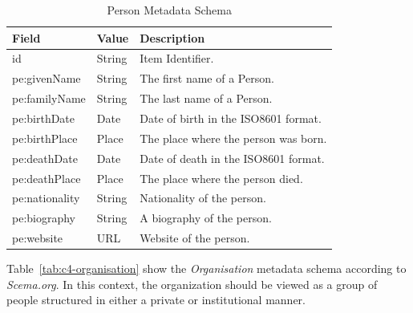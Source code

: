 \begin{longtable}{|p{}|p{}|p{}|}
    \caption{Person Metadata Schema} \label{tab:c4-person} \\
    \hline
    \textbf{Field} & \textbf{Value} & \textbf{Description} \\
    \hline

    \scriptsize id                      & \scriptsize String                                            &  \scriptsize Item Identifier. \\
    \hline
    \scriptsize pe:givenName               & \scriptsize String                                             &  \scriptsize The first name of a Person.\\
    \hline
    \scriptsize pe:familyName              & \scriptsize String                                             &  \scriptsize The last name of a Person.\\
    \hline
    \scriptsize pe:birthDate               & \scriptsize Date                                             &  \scriptsize Date of birth in the ISO8601 format.\\
    \hline
    \scriptsize pe:birthPlace              & \scriptsize \textcolor{uniudColor3}{Place}                    &  \scriptsize The place where the person was born.\\
    \hline
    \scriptsize pe:deathDate               & \scriptsize Date                                             &  \scriptsize Date of death in the ISO8601 format.\\
    \hline
    \scriptsize pe:deathPlace              & \scriptsize \textcolor{uniudColor3}{Place}                    &  \scriptsize The place where the person died.\\
    \hline
    \scriptsize pe:nationality             & \scriptsize String                                       &  \scriptsize Nationality of the person.\\
    \hline
    \scriptsize pe:biography               & \scriptsize String                                       &  \scriptsize A biography of the person.\\
    \hline
    \scriptsize pe:website                 & \scriptsize URL                                       &  \scriptsize Website of the person.\\
    \hline

\end{longtable}

Table~\ref{tab:c4-organisation} show the \textit{Organisation} metadata schema according to \textit{Scema.org}. In this context, the organization should be viewed as a group of people structured in either a private or institutional manner.

